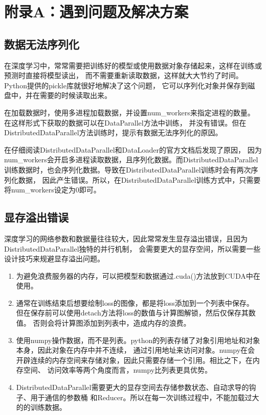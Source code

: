 \section*{附录A：遇到问题及解决方案}

\subsection*{数据无法序列化}

在深度学习中，常常需要把训练好的模型或使用数据对象存储起来，这样在训练或预测时直接将模型读出，
而不需要重新读取数据，这样就大大节约了时间。Python提供的pickle库就很好地解决了这个问题，
它可以序列化对象并保存到磁盘中，并在需要的时候读取出来。

在加载数据时，使用多进程加载数据，并设置num\_workers来指定进程的数量。
在这样形式下获取的数据可以在DataParallel方法中训练，
并没有错误。但在DistributedDataParallel方法训练时，提示有数据无法序列化的原因。

在仔细阅读DistributedDataParallel和DataLoader的官方文档后发现了原因，
因为num\_workers会开启多进程读取数据，且序列化数据。而DistributedDataParallel
训练数据时，也会序列化数据。导致在DistributedDataParallel训练时会有两次序列化数据，
因此产生错误。所以，在DistributedDataParallel训练方式中，只需要
将num\_workers设定为0即可。

\subsection*{显存溢出错误}

深度学习的网络参数和数据量往往较大，因此常常发生显存溢出错误，且因为DistributedDataParallel独特的并行机制，
会需要更大的显存空间，所以需要一些设计技巧来规避显存溢出问题。

\begin{enumerate}[leftmargin=0pt,itemindent=3.5\ccwd]
    \item 为避免浪费服务器的内存，可以把模型和数据通过.cuda()方法放到CUDA中在使用。
    \item 通常在训练结束后想要绘制loss的图像，都是将loss添加到一个列表中保存。
    但在保存前可以使用detach方法将loss的数值与计算图解锁，然后仅保存其数值。
    否则会将计算图添加到列表中，造成内存的浪费。
    \item 使用numpy操作数据，而不是列表。python的列表存储了对象引用地址和对象本身，因此对象在内存中并不连续，
    通过引用地址来访问对象。numpy在会开辟连续的内存空间来存储对象，因此只需要存储一个引用。相比之下，在内存空间、
    访问效率等两个角度而言，numpy比列表更具优势。
    \item DistributedDataParallel需要更大的显存空间去存储参数状态、自动求导的钩子、用于通信的参数桶
    和Reducer。所以在每一次训练过程中，不能加载过大的的训练数据。
\end{enumerate}

